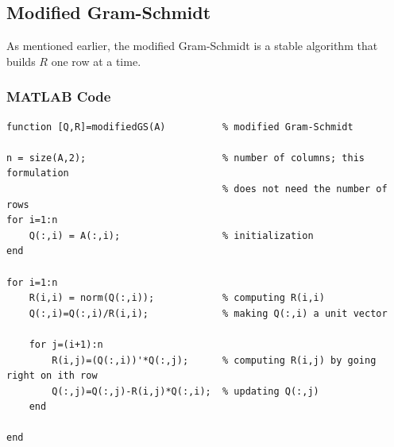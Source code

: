 \documentclass[letterpaper]{article}
\newcommand{\0}{\mathbf{0}}
\begin{document}
\subsection{Modified Gram-Schmidt}
As mentioned earlier, the modified Gram-Schmidt is a stable algorithm that builds $R$ one row at a time. 

\subsubsection{MATLAB Code}
\begin{mdframed}
    \begin{verbatim}
function [Q,R]=modifiedGS(A)          % modified Gram-Schmidt

n = size(A,2);                        % number of columns; this formulation
                                      % does not need the number of rows
for i=1:n                             
    Q(:,i) = A(:,i);                  % initialization
end

for i=1:n
    R(i,i) = norm(Q(:,i));            % computing R(i,i) 
    Q(:,i)=Q(:,i)/R(i,i);             % making Q(:,i) a unit vector

    for j=(i+1):n
        R(i,j)=(Q(:,i))'*Q(:,j);      % computing R(i,j) by going right on ith row
        Q(:,j)=Q(:,j)-R(i,j)*Q(:,i);  % updating Q(:,j)
    end

end
    \end{verbatim}
\end{mdframed}
\end{document}
